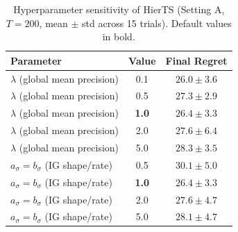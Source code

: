 \begin{table}[ht]
\centering
\caption{Hyperparameter sensitivity of HierTS (Setting A, $T=200$, mean $\pm$ std across 15 trials). Default values in bold.}
\label{tab:sensitivity}
\begin{tabular}{lcc}
\toprule
Parameter & Value & Final Regret \\
\midrule
  $\lambda$ (global mean precision) & 0.1 & $26.0\pm3.6$ \\
  $\lambda$ (global mean precision) & 0.5 & $27.3\pm2.9$ \\
  $\lambda$ (global mean precision) & \textbf{1.0} & \textbf{$26.4\pm3.3$} \\
  $\lambda$ (global mean precision) & 2.0 & $27.6\pm6.4$ \\
  $\lambda$ (global mean precision) & 5.0 & $28.3\pm3.5$ \\
\midrule
  $a_\sigma = b_\sigma$ (IG shape/rate) & 0.5 & $30.1\pm5.0$ \\
  $a_\sigma = b_\sigma$ (IG shape/rate) & \textbf{1.0} & \textbf{$26.4\pm3.3$} \\
  $a_\sigma = b_\sigma$ (IG shape/rate) & 2.0 & $27.6\pm4.7$ \\
  $a_\sigma = b_\sigma$ (IG shape/rate) & 5.0 & $28.1\pm4.7$ \\
\bottomrule
\end{tabular}
\end{table}